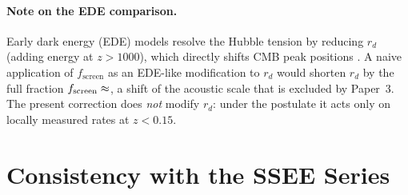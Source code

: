 \documentclass[12pt,a4paper]{article}
\newcommand{\fsc}{f_{\mathrm{screen}}}
\begin{document}
\paragraph{Note on the EDE comparison.}
Early dark energy (EDE) models \citep{Karwal2016,Poulin2019,Smith2020}
resolve the Hubble tension by reducing $r_d$
(adding energy at $z > 1000$), which directly shifts CMB peak positions
\citep{Hill2020}.
A naive application of $\fsc$ as an EDE-like modification to $r_d$ would
shorten $r_d$ by the full fraction $\fsc\approx\val{F_SCREEN_IR_d4}$, a shift of the
acoustic scale that is excluded by Paper~3.
The present correction does \emph{not} modify $r_d$: under the postulate it
acts only on locally measured rates at $z < 0.15$.

\section{Consistency with the SSEE Series}
\label{sec:consistency}
\end{document}
